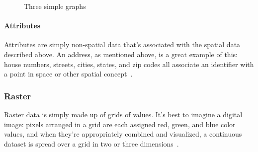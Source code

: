 \begin{figure}
      \hfill
        \hfill
{}
       \hfill
{}
    
    \caption{Three simple graphs}
    \label{fig:three graphs}
    
\end{figure}

\paragraph{Attributes}
Attributes are simply non-spatial data that's associated with the spatial data described above. An address, as mentioned above, is a great example of this: house numbers, streets, cities, states, and zip codes all associate an identifier with a point in space or other spatial concept~\cite{gentle_intro}.

\subsubsection{Raster}
Raster data is simply made up of grids of values. It's best to imagine a digital image: pixels arranged in a grid are each assigned red, green, and blue color values, and when they're appropriately combined and visualized, a continuous dataset is spread over a grid in two or three dimensions~\cite{gentle_intro}.

